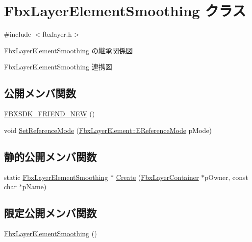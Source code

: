 \hypertarget{class_fbx_layer_element_smoothing}{}\section{Fbx\+Layer\+Element\+Smoothing クラス}
\label{class_fbx_layer_element_smoothing}


{\ttfamily \#include $<$fbxlayer.\+h$>$}



Fbx\+Layer\+Element\+Smoothing の継承関係図


Fbx\+Layer\+Element\+Smoothing 連携図
\subsection*{公開メンバ関数}
\begin{DoxyCompactItemize}
\item 
\hyperlink{class_fbx_layer_element_smoothing_aea45577e6b6315795adeaf801538b5ab}{F\+B\+X\+S\+D\+K\+\_\+\+F\+R\+I\+E\+N\+D\+\_\+\+N\+EW} ()
\item 
void \hyperlink{class_fbx_layer_element_smoothing_a8c17c1dad55d4a42648c6f40337dd8c5}{Set\+Reference\+Mode} (\hyperlink{class_fbx_layer_element_a00f04654580ca9b2f5d292c11abd83fc}{Fbx\+Layer\+Element\+::\+E\+Reference\+Mode} p\+Mode)
\end{DoxyCompactItemize}
\subsection*{静的公開メンバ関数}
\begin{DoxyCompactItemize}
\item 
static \hyperlink{class_fbx_layer_element_smoothing}{Fbx\+Layer\+Element\+Smoothing} $\ast$ \hyperlink{class_fbx_layer_element_smoothing_afdb42053590ce288c60e5539a0b2d875}{Create} (\hyperlink{class_fbx_layer_container}{Fbx\+Layer\+Container} $\ast$p\+Owner, const char $\ast$p\+Name)
\end{DoxyCompactItemize}
\subsection*{限定公開メンバ関数}
\begin{DoxyCompactItemize}
\item 
\hyperlink{class_fbx_layer_element_smoothing_a3821d7b7a1de97865516aa3937290d82}{Fbx\+Layer\+Element\+Smoothing} ()
\end{DoxyCompactItemize}
